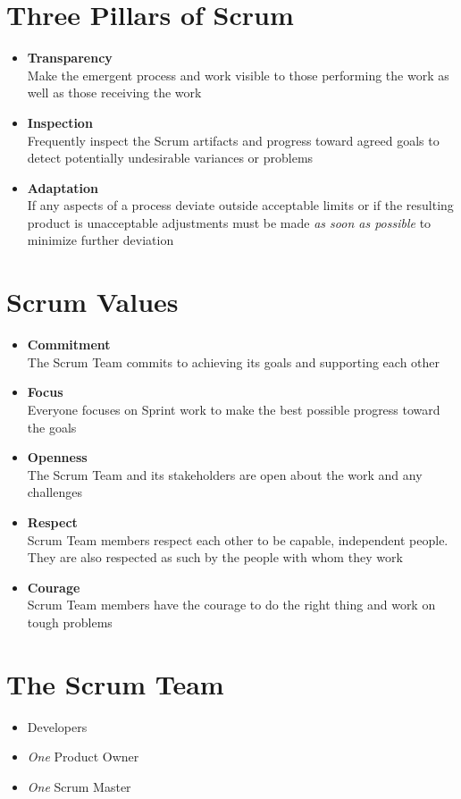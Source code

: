 \documentclass[a4paper,11pt,twocolumn]{article}
\begin{document}
\section*{Three Pillars of Scrum}
\begin{itemize}
	\item \textbf{Transparency}\\
	      Make the emergent process and work visible to those performing the work as well as those receiving the work
	\item \textbf{Inspection}\\
	      Frequently inspect the Scrum artifacts and progress toward agreed goals to detect potentially undesirable variances or problems
	\item \textbf{Adaptation}\\
	      If any aspects of a process deviate outside acceptable limits or if the resulting product is unacceptable adjustments must be made \textit{as soon as possible} to minimize further deviation
\end{itemize}

\section*{Scrum Values}
\begin{itemize}
	\item \textbf{Commitment}\\
	      The Scrum Team commits to achieving its goals and supporting each other
	\item \textbf{Focus}\\
	      Everyone focuses on Sprint work to make the best possible progress toward the goals
	\item \textbf{Openness}\\
	      The Scrum Team and its stakeholders are open about the work and any challenges
	\item \textbf{Respect}\\
	      Scrum Team members respect each other to be capable, independent people. They are also respected as such by the people with whom they work
	\item \textbf{Courage}\\
	      Scrum Team members have the courage to do the right thing and work on tough problems
\end{itemize}

\section*{The Scrum Team}
\begin{itemize}
	\item Developers
	\item \textit{One} Product Owner
	\item \textit{One} Scrum Master
\end{itemize}
\end{document}
